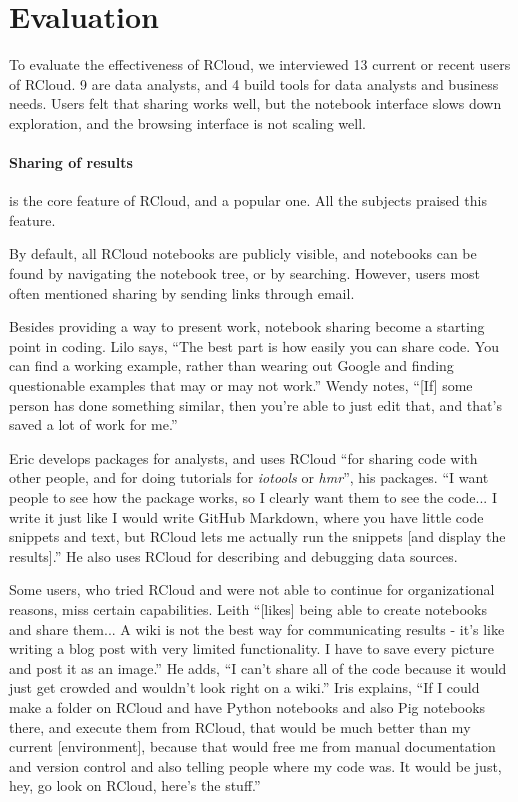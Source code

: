\section{Evaluation\label{sec:interviews}}

To evaluate the effectiveness of RCloud, we interviewed 13 current or
recent users of RCloud. 9 are data analysts, and 4 build tools for data
analysts and business needs. Users felt that sharing works well, but the notebook
interface slows down exploration, and the browsing interface is not scaling well.

\paragraph*{Sharing of results} is the core feature of RCloud, and a popular one. All
the subjects praised this feature.

By default, all RCloud notebooks are publicly visible, and notebooks can be
found by navigating the notebook tree, or by searching. However, users most
often mentioned sharing by sending links through email.

Besides providing a way to present work, notebook sharing become a starting point
in coding. Lilo says, ``The best part is how easily you can
share code. You can find a working example, rather than wearing
out Google and finding questionable examples that may or may not work.'' Wendy
notes, ``[If] some person has done something similar, then you're able to just
edit that, and that's saved a lot of work for me.''

Eric develops packages for analysts, and uses RCloud ``for sharing code with
other people, and for doing tutorials for {\em iotools} or {\em hmr}'', his packages.
``I want people to see how the package works, so I clearly want them
to see the code... I write it just like I would write GitHub
Markdown, where you have little code snippets and text, but RCloud lets me
actually run the snippets [and display the results].'' He also uses RCloud for
describing and debugging data sources.

Some users, who tried RCloud and were not able to continue for organizational
reasons, miss certain capabilities. Leith ``[likes]  being
able to create notebooks and share them... A wiki is not the best way for
communicating results - it's  like writing a blog post with very limited
functionality. I have to save every picture and post it as an image.'' He adds,
``I can't share all of the code because it would just get crowded and wouldn't
look right on a wiki.'' Iris explains, ``If I could make a folder on RCloud and
have Python notebooks and also Pig notebooks there, and execute them from RCloud,
that would be much better than my current [environment], because that would free
me from manual documentation and version control and also telling people where
my code was. It would be just, hey, go look on RCloud, here's the stuff.''

